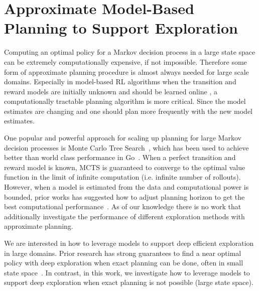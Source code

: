 \section{Approximate Model-Based Planning to Support Exploration}\label{sec:exp}

Computing an optimal policy for a Markov decision process in a large state space can be extremely computationally expensive, if not impossible. Therefore some form of approximate planning procedure is almost always needed for large scale  domains. Especially in model-based RL algorithms when the transition and reward models are initially unknown and should be learned online %
, a computationally tractable planning algorithm is more critical. Since the model estimates are changing and one should plan more frequently with the new model estimates.

One popular and powerful approach for scaling up planning for large Markov decision processes is Monte Carlo Tree Search~\citep{chaslot2008monte, browne2012survey}, which has been used to achieve better than world class performance in Go~\citep{silver2016mastering}. When a perfect transition and reward model is known, MCTS is guaranteed to converge to the optimal value function in the limit of infinite computation (i.e. infinite number of rollouts). However, when a model is estimated from the data and computational power is bounded, prior works has suggested how to adjust planning horizon to get the best computational performance~\citep{jiang2015dependence}. As of our knowledge there is no work that additionally investigate the performance of different exploration methods with approximate planning.%

We are interested in how to leverage models to support deep efficient exploration in large domains. Prior research has strong guarantees to find a near optimal policy with deep exploration when exact planning can be done, often in small state space~\citep{brunskill2009provably, brafman2002r}. In contrast, in this work, we investigate how to leverage models to support deep exploration when exact planning is not possible (large state space). 

